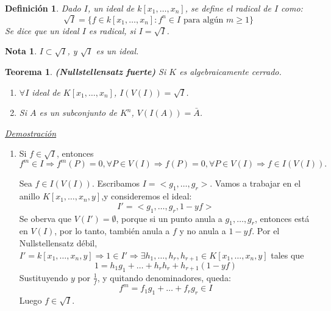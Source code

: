 \documentclass{article}
\newtheorem{teor}{Teorema}
\newtheorem{nota}{Nota}
\newtheorem{Def}{Definición}
\begin{document}
\begin{Def}
  Dado $I$, un ideal de $k[x_1,\dots, x_n]$, se define el radical de $I$ como:
  $$\sqrt{I}=\{ f \in k[x_1,\dots,x_n] : f^n \in I \text{ para algún } m\ge 1\}$$
  Se dice que un ideal $I$ es radical, si $I=\sqrt{I}$.
\end{Def}

\begin{nota}
  $I\subset \sqrt{I}$, y $\sqrt{I}$ es un ideal.
\end{nota}

\begin{teor}
  \textbf{(Nullstellensatz fuerte)} Si $K$ es algebraicamente cerrado.
  \begin{enumerate}
  \item $\forall I$ ideal de $K[x_1,\dots, x_n]$, $I(V(I))=\sqrt{I}$.
  \item Si $A$ es un subconjunto de $K^n$, $V(I(A))=\bar{A}$. 
  \end{enumerate}
\end{teor}

\textit{\underline{Demostración}}

\vspace{3mm}
\begin{enumerate}
\item \framebox{$\supseteq $} Si $f\in \sqrt{I}$, entonces $f^m\in I \Rightarrow f^m(P)=0, \forall P \in V(I) \Rightarrow f(P)=0, \forall P\in V(I) \Rightarrow f\in I(V(I)). $

\framebox{$\subseteq $} Sea $f\in I(V(I))$. Escribamos $I=<g_1,\dots,g_r>$. Vamos a trabajar en el anillo $K[x_1,\dots, x_n,y]$,y consideremos el ideal:
$$I'=<g_1,\dots,g_r,1-yf>$$
Se oberva que $V(I')=\emptyset$, porque si un punto anula a $g_1,\dots,g_r$, entonces está en $V(I)$, por lo tanto, también anula a $f$ y no anula a $1-yf$.
Por el Nullstellensatz débil, $I'=k[x_1,\dots,x_n,y] \Rightarrow 1\in I' \Rightarrow \exists h_1,\dots,h_r,h_{r+1}\in K[x_1,\dots,x_n,y]$ tales que
$$1=h_1g_1+\dots+h_rh_r+h_{r+1}(1-yf) $$
Sustituyendo $y$ por $\frac{1}{f}$, y quitando denominadores, queda:
$$f^m=f_1g_1+\dots+f_rg_r\in I$$
Luego $f\in \sqrt{I}$.
\end{enumerate}
\end{document}
